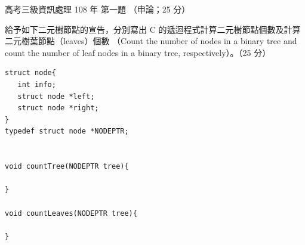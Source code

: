 \begin{pastexam}[label={px:gk3-108-ds-01}]{高考三級資訊處理 108 年 第一題}
（申論；25 分）

給予如下二元樹節點的宣告，分別寫出 C 的遞迴程式計算二元樹節點個數及計算二元樹葉節點（leaves）個數
（Count the number of nodes in a binary tree and count the number of leaf nodes in a binary tree,
respectively）。（25 分）
\begin{verbatim}
struct node{
   int info;
   struct node *left;
   struct node *right;
}
typedef struct node *NODEPTR;


void countTree(NODEPTR tree){

}

void countLeaves(NODEPTR tree){

}
\end{verbatim}
\end{pastexam}

